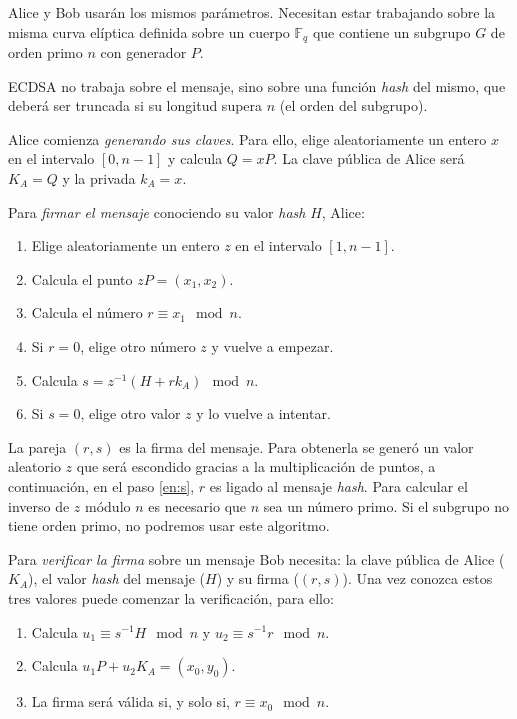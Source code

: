 \documentclass[
  a4paper,
  12pt,
  spanish,
]{scrartcl}
\begin{document}
Alice y Bob usarán los mismos parámetros. Necesitan estar trabajando sobre la misma curva elíptica definida sobre un cuerpo $\mathbb{F}_q$ que contiene un subgrupo $G$ de orden primo $n$ con generador $P$.

ECDSA no trabaja sobre el mensaje, sino sobre una función \textit{hash} del mismo, que deberá ser truncada si su longitud supera $n$ (el orden del subgrupo).

Alice comienza \textit{generando sus claves}. Para ello, elige aleatoriamente un entero $x$ en el intervalo $[0,n-1]$ y calcula $Q=xP$. La clave pública de Alice será $K_A=Q$ y la privada $k_A=x$.

Para \textit{firmar el mensaje} conociendo su valor \textit{hash} $H$, Alice:

\begin{enumerate}
\item Elige aleatoriamente un entero $z$ en el intervalo $[1,n-1]$.
\item Calcula el punto $zP =(x_1,x_2)$.
\item Calcula el número $r \equiv x_1 \mod n$.
\item Si $r=0$, elige otro número $z$ y vuelve a empezar.
\item Calcula $s=z^{-1}(H+rk_A)\mod n$. \label{en:s}
\item Si $s=0$, elige otro valor $z$ y lo vuelve a intentar.
\end{enumerate}

La pareja $(r, s)$ es la firma del mensaje. Para obtenerla se generó un valor aleatorio $z$ que será escondido gracias a la multiplicación de puntos, a continuación, en el paso \ref{en:s}, $r$ es ligado al mensaje \textit{hash}. Para calcular el inverso de $z$ módulo $n$ es necesario que $n$ sea un número primo. Si el subgrupo no tiene orden primo, no podremos usar este algoritmo.

Para \textit{verificar la firma} sobre un mensaje Bob necesita: la clave pública de Alice ($K_A$), el valor \textit{hash} del mensaje ($H$) y su firma ($(r,s)$). Una vez conozca estos tres valores puede comenzar la verificación, para ello:

\begin{enumerate}
\item Calcula $u_1 \equiv s^{-1}H \mod n$ y $u_2 \equiv s^{-1}r \mod n$.
\item Calcula $u_1P + u_2 K_A = (x_0, y_0)$.
\item La firma será válida si, y solo si, $r \equiv x_0 \mod n$.
\end{enumerate}
\end{document}
